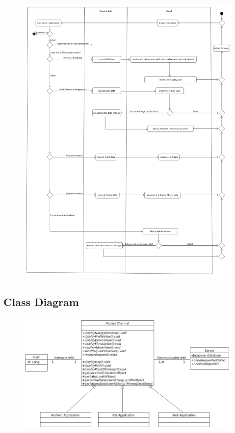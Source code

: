\begin{figure}[ht]
	\includegraphics[width=\textwidth]{Access_Modules/AccessActivity.png}
\end{figure}

\subsection{Class Diagram}

\begin{figure}[ht]
	\includegraphics[width=\textwidth]{Access_Modules/AccessClassDiagramV2.png}
\end{figure}
